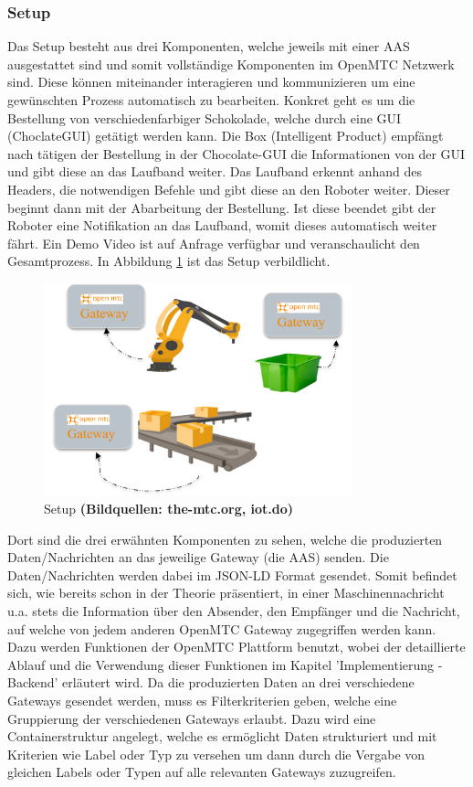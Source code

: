\documentclass[
	12pt,								%
	DIV10,
	a4paper,         		%
	oneside,						%
	parskip=half,				%
	headings=normal,			%
	listof=totoc,					%
	bibliography=totoc,						%
	index=totoc,						%
	final								%
]{scrartcl}
\begin{document}
\subsubsection*{Setup}
Das Setup besteht aus drei Komponenten, welche jeweils mit einer AAS ausgestattet sind und somit vollständige Komponenten im OpenMTC Netzwerk sind. Diese können miteinander interagieren und kommunizieren um eine gewünschten Prozess automatisch zu bearbeiten. Konkret geht es um die Bestellung von verschiedenfarbiger Schokolade, welche durch eine GUI (ChoclateGUI) getätigt werden kann. Die Box (Intelligent Product) empfängt nach tätigen der Bestellung in der Chocolate-GUI die Informationen von der GUI und gibt diese an das Laufband weiter. Das Laufband erkennt anhand des Headers, die notwendigen Befehle und gibt diese an den Roboter weiter. Dieser beginnt dann mit der Abarbeitung der Bestellung. Ist diese beendet gibt der Roboter eine Notifikation an das Laufband, womit dieses automatisch weiter fährt. Ein Demo Video ist auf Anfrage verfügbar und veranschaulicht den Gesamtprozess. In Abbildung \ref{setup} ist das Setup verbildlicht. 

\begin{figure}[H]
\centering
\includegraphics[width=0.8\textwidth]{setup}
\caption{Setup \textbf{(Bildquellen: the-mtc.org, iot.do)}}
\label{setup}
\end{figure}

Dort sind die drei erwähnten Komponenten zu sehen, welche die produzierten Daten/Nachrichten an das jeweilige Gateway (die AAS) senden. Die Daten/Nachrichten werden dabei im JSON-LD Format gesendet. Somit befindet sich, wie bereits schon in der Theorie präsentiert, in einer Maschinennachricht u.a. stets die Information über den Absender, den Empfänger und die Nachricht, auf welche von jedem anderen OpenMTC Gateway zugegriffen werden kann. Dazu werden Funktionen der OpenMTC Plattform benutzt, wobei der detaillierte Ablauf und die Verwendung dieser Funktionen im Kapitel 'Implementierung - Backend' erläutert wird.
Da die produzierten Daten an drei verschiedene Gateways gesendet werden, muss es Filterkriterien geben, welche eine Gruppierung der verschiedenen Gateways erlaubt. Dazu wird eine Containerstruktur angelegt, welche es ermöglicht Daten strukturiert und mit Kriterien wie Label oder Typ zu versehen um dann durch die Vergabe von gleichen Labels oder Typen auf alle relevanten Gateways zuzugreifen.
\end{document}
